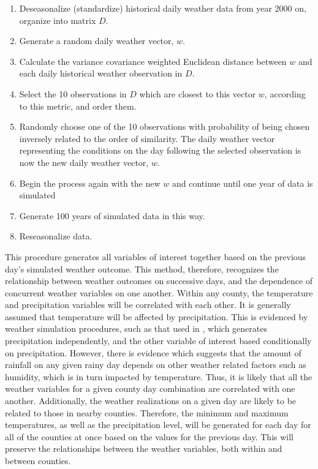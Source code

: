 \begin{enumerate}
            \item Deseasonalize (standardize) historical daily weather data from year 2000 on, organize into matrix $D$.
            \item Generate a random daily weather vector, $w$.
            \item Calculate the variance covariance weighted Euclidean distance between $w$ and each daily historical weather observation in $D$. 
            \item Select the 10 observations in $D$ which are closest to this vector $w$, according to this metric, and order them.
            \item Randomly choose one of the 10 observations with probability of being chosen inversely related to the order of similarity. The daily weather vector representing the conditions on the day following the selected observation is now the new daily weather vector, $w$.
            \item Begin the process again with the new $w$ and continue until one year of data is simulated
            \item Generate 100 years of simulated data in this way.
            \item Reseasonalize data. 
\end{enumerate}


This procedure generates all variables of interest together based on the previous day's simulated weather outcome. This method, therefore, recognizes the relationship between weather outcomes on successive days, and the dependence of concurrent weather variables on one another. Within any county, the temperature and precipitation variables will be correlated with each other. It is generally assumed that temperature will be affected by precipitation.  This is evidenced by weather simulation procedures, such as that used in \cite{rajagopalan1997multivariate}, which generates precipitation independently, and the other variable of interest based conditionally on precipitation. However, there is evidence which suggests that the amount of rainfall on any given rainy day depends on other weather related factors such as humidity, which is in turn impacted by temperature. Thus, it is likely that all the weather variables for a given county day combination are correlated with one another. Additionally, the weather realizations on a given day are likely to be related to those in nearby counties. Therefore, the minimum and maximum temperatures, as well as the precipitation level, will be generated for each day for all of the counties at once based on the values for the previous day. This will preserve the relationships between the weather variables, both within and between counties. 

